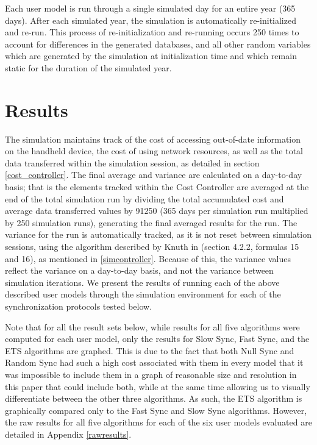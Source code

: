 Each user model is run through a single simulated day for an entire year (365 days).  After each simulated year, the simulation is automatically re-initialized and re-run.  This process of re-initialization and re-running occurs 250 times to account for differences in the generated databases, and all other random variables which are generated by the simulation at initialization time and which remain static for the duration of the simulated year.  

\section{Results}

The simulation maintains track of the cost of accessing out-of-date information on the handheld device, the cost of using network resources, as well as the total data transferred within the simulation session, as detailed in section \ref{cost_controller}.  The final average and variance are calculated on a day-to-day basis; that is the elements tracked within the Cost Controller are averaged at the end of the total simulation run by dividing the total accumulated cost and average data transferred values by 91250 (365 days per simulation run multiplied by 250 simulation runs), generating the final averaged results for the run.  The variance for the run is automatically tracked, as it is not reset between simulation sessions, using the algorithm described by Knuth in \cite{RefWorks:42} (section 4.2.2, formulas 15 and 16), as mentioned in \ref{simcontroller}.  Because of this, the variance values reflect the variance on a day-to-day basis, and not the variance between simulation iterations.  We present the results of running each of the above described user models through the simulation environment for each of the synchronization protocols tested below.

Note that for all the result sets below, while results for all five algorithms were computed for each user model, only the results for Slow Sync, Fast Sync, and the ETS algorithms are graphed.  This is due to the fact that both Null Sync and Random Sync had such a high cost associated with them in every model that it was impossible to include them in a graph of reasonable size and resolution in this paper that could include both, while at the same time allowing us to visually differentiate between the other three algorithms.  As such, the ETS algorithm is graphically compared only to the Fast Sync and Slow Sync algorithms.  However, the raw results for all five algorithms for each of the six user models evaluated are detailed in Appendix \ref{rawresults}.


